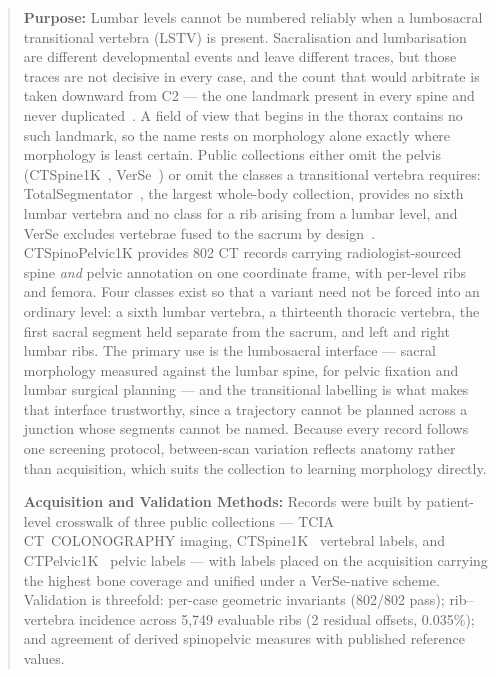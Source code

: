 \documentclass[aapm,mph,amsmath,amssymb,reprint,linenumbers]{revtex4-2}
\begin{document}
\begin{abstract}
\textbf{Purpose:} Lumbar levels cannot be numbered reliably when a lumbosacral
transitional vertebra (LSTV) is present. Sacralisation and lumbarisation are different
developmental events and leave different traces, but those traces are not decisive in every
case, and the count that would arbitrate is taken downward from C2 --- the one landmark
present in every spine and never duplicated~\cite{koninwalz2010}. A field of view that
begins in the thorax contains no such landmark, so the name rests on morphology alone
exactly where morphology is least certain. Public collections either omit the pelvis
(CTSpine1K~\cite{ctspine1k}, VerSe~\cite{verse2021}) or omit the classes a transitional
vertebra requires: TotalSegmentator~\cite{totalsegmentator}, the largest whole-body
collection, provides no sixth lumbar vertebra and no class for a rib arising from a lumbar
level, and VerSe excludes vertebrae fused to the sacrum by design~\cite{versedata2021}.
CTSpinoPelvic1K provides 802 CT records carrying radiologist-sourced spine \emph{and}
pelvic annotation on one coordinate frame, with per-level ribs and femora. Four classes
exist so that a variant need not be forced into an ordinary level: a sixth lumbar vertebra,
a thirteenth thoracic vertebra, the first sacral segment held separate from the sacrum, and
left and right lumbar ribs. The primary use is the lumbosacral interface --- sacral
morphology measured against the lumbar spine, for pelvic fixation and lumbar surgical
planning --- and the transitional labelling is what makes that interface trustworthy, since
a trajectory cannot be planned across a junction whose segments cannot be named. Because
every record follows one screening protocol, between-scan variation reflects anatomy rather
than acquisition, which suits the collection to learning morphology directly.

\textbf{Acquisition and Validation Methods:} Records were built by patient-level
crosswalk of three public collections --- TCIA CT~COLONOGRAPHY imaging, CTSpine1K~\cite{ctspine1k}
vertebral labels, and CTPelvic1K~\cite{ctpelvic1k} pelvic labels --- with labels placed on the acquisition
carrying the highest bone coverage and unified under a VerSe-native scheme. Validation is
threefold: per-case geometric invariants (802/802 pass); rib--vertebra incidence across
5{,}749 evaluable ribs (2 residual offsets, 0.035\%); and agreement of derived spinopelvic
measures with published reference values.


\end{abstract}
\end{document}
